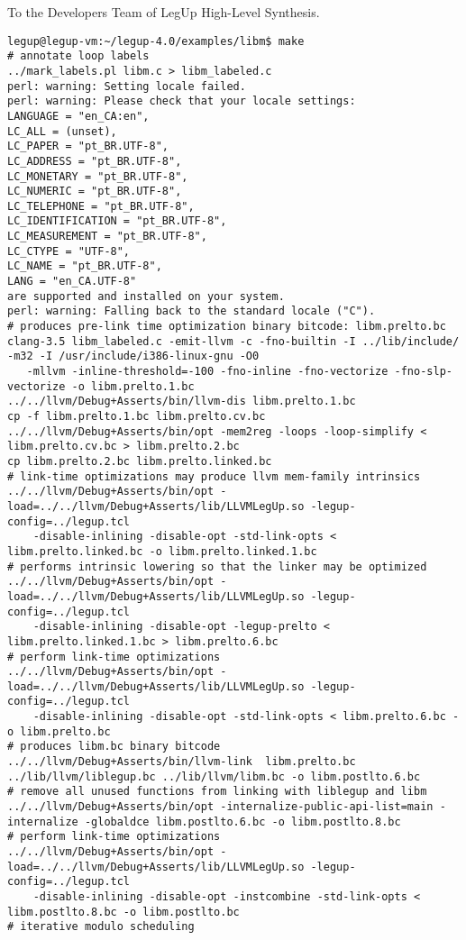 \documentclass[11pt]{letter}
\begin{document}
\begin{letter}{To the Developers Team of LegUp High-Level Synthesis.}
{ \tiny
\begin{verbatim}
legup@legup-vm:~/legup-4.0/examples/libm$ make
# annotate loop labels
../mark_labels.pl libm.c > libm_labeled.c
perl: warning: Setting locale failed.
perl: warning: Please check that your locale settings:
LANGUAGE = "en_CA:en",
LC_ALL = (unset),
LC_PAPER = "pt_BR.UTF-8",
LC_ADDRESS = "pt_BR.UTF-8",
LC_MONETARY = "pt_BR.UTF-8",
LC_NUMERIC = "pt_BR.UTF-8",
LC_TELEPHONE = "pt_BR.UTF-8",
LC_IDENTIFICATION = "pt_BR.UTF-8",
LC_MEASUREMENT = "pt_BR.UTF-8",
LC_CTYPE = "UTF-8",
LC_NAME = "pt_BR.UTF-8",
LANG = "en_CA.UTF-8"
are supported and installed on your system.
perl: warning: Falling back to the standard locale ("C").
# produces pre-link time optimization binary bitcode: libm.prelto.bc
clang-3.5 libm_labeled.c -emit-llvm -c -fno-builtin -I ../lib/include/ -m32 -I /usr/include/i386-linux-gnu -O0 
   -mllvm -inline-threshold=-100 -fno-inline -fno-vectorize -fno-slp-vectorize -o libm.prelto.1.bc
../../llvm/Debug+Asserts/bin/llvm-dis libm.prelto.1.bc
cp -f libm.prelto.1.bc libm.prelto.cv.bc
../../llvm/Debug+Asserts/bin/opt -mem2reg -loops -loop-simplify < libm.prelto.cv.bc > libm.prelto.2.bc
cp libm.prelto.2.bc libm.prelto.linked.bc
# link-time optimizations may produce llvm mem-family intrinsics
../../llvm/Debug+Asserts/bin/opt -load=../../llvm/Debug+Asserts/lib/LLVMLegUp.so -legup-config=../legup.tcl 
    -disable-inlining -disable-opt -std-link-opts < libm.prelto.linked.bc -o libm.prelto.linked.1.bc
# performs intrinsic lowering so that the linker may be optimized
../../llvm/Debug+Asserts/bin/opt -load=../../llvm/Debug+Asserts/lib/LLVMLegUp.so -legup-config=../legup.tcl 
    -disable-inlining -disable-opt -legup-prelto < libm.prelto.linked.1.bc > libm.prelto.6.bc
# perform link-time optimizations
../../llvm/Debug+Asserts/bin/opt -load=../../llvm/Debug+Asserts/lib/LLVMLegUp.so -legup-config=../legup.tcl 
    -disable-inlining -disable-opt -std-link-opts < libm.prelto.6.bc -o libm.prelto.bc
# produces libm.bc binary bitcode
../../llvm/Debug+Asserts/bin/llvm-link  libm.prelto.bc ../lib/llvm/liblegup.bc ../lib/llvm/libm.bc -o libm.postlto.6.bc
# remove all unused functions from linking with liblegup and libm
../../llvm/Debug+Asserts/bin/opt -internalize-public-api-list=main -internalize -globaldce libm.postlto.6.bc -o libm.postlto.8.bc
# perform link-time optimizations
../../llvm/Debug+Asserts/bin/opt -load=../../llvm/Debug+Asserts/lib/LLVMLegUp.so -legup-config=../legup.tcl 
    -disable-inlining -disable-opt -instcombine -std-link-opts < libm.postlto.8.bc -o libm.postlto.bc
# iterative modulo scheduling

\end{verbatim}}
\end{letter}
\end{document}
